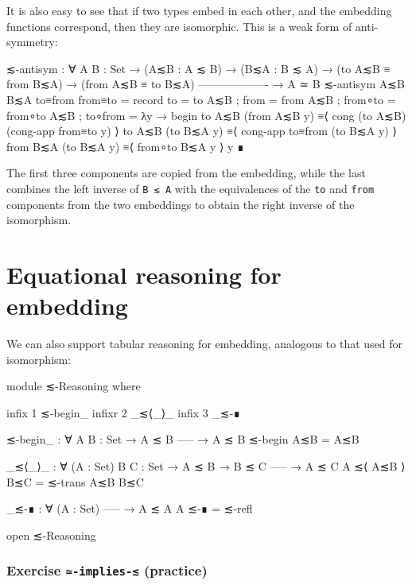 It is also easy to see that if two types embed in each other, and the
embedding functions correspond, then they are isomorphic. This is a weak
form of anti-symmetry:

\begin{fence}
\begin{code}
≲-antisym : ∀ {A B : Set}
  → (A≲B : A ≲ B)
  → (B≲A : B ≲ A)
  → (to A≲B ≡ from B≲A)
  → (from A≲B ≡ to B≲A)
    -------------------
  → A ≃ B
≲-antisym A≲B B≲A to≡from from≡to =
  record
    { to      = to A≲B
    ; from    = from A≲B
    ; from∘to = from∘to A≲B
    ; to∘from = λ{y →
        begin
          to A≲B (from A≲B y)
        ≡⟨ cong (to A≲B) (cong-app from≡to y) ⟩
          to A≲B (to B≲A y)
        ≡⟨ cong-app to≡from (to B≲A y) ⟩
          from B≲A (to B≲A y)
        ≡⟨ from∘to B≲A y ⟩
          y
        ∎}
    }
\end{code}
\end{fence}

The first three components are copied from the embedding, while the last
combines the left inverse of \texttt{B\ ≲\ A} with the equivalences of
the \texttt{to} and \texttt{from} components from the two embeddings to
obtain the right inverse of the isomorphism.

\hypertarget{equational-reasoning-for-embedding}{%
\section{Equational reasoning for
embedding}\label{equational-reasoning-for-embedding}}

We can also support tabular reasoning for embedding, analogous to that
used for isomorphism:

\begin{fence}
\begin{code}
module ≲-Reasoning where

  infix  1 ≲-begin_
  infixr 2 _≲⟨_⟩_
  infix  3 _≲-∎

  ≲-begin_ : ∀ {A B : Set}
    → A ≲ B
      -----
    → A ≲ B
  ≲-begin A≲B = A≲B

  _≲⟨_⟩_ : ∀ (A : Set) {B C : Set}
    → A ≲ B
    → B ≲ C
      -----
    → A ≲ C
  A ≲⟨ A≲B ⟩ B≲C = ≲-trans A≲B B≲C

  _≲-∎ : ∀ (A : Set)
      -----
    → A ≲ A
  A ≲-∎ = ≲-refl

open ≲-Reasoning
\end{code}
\end{fence}

\hypertarget{exercise--implies--practice}{%
\subsubsection{\texorpdfstring{Exercise \texttt{≃-implies-≲}
(practice)}{Exercise ≃-implies-≲ (practice)}}\label{exercise--implies--practice}}


